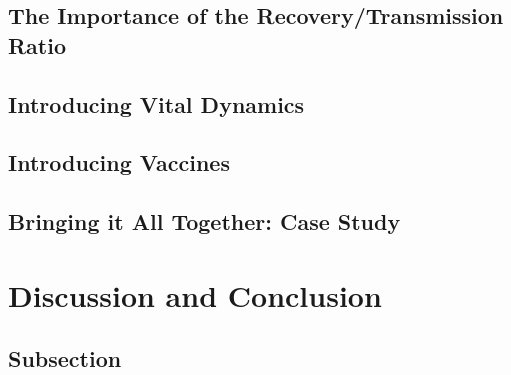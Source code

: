 \documentclass[]{article}
\begin{document}
\subsection{The Importance of the Recovery/Transmission Ratio} \label{sec:recovery-rates}


\subsection{Introducing Vital Dynamics} \label{sec:vital-dynamics}

\subsection{Introducing Vaccines} \label{sec:vaccines}

\subsection{Bringing it All Together: Case Study} \label{sec:case-study}


\section{Discussion and Conclusion} \label{sec:conclusion}



\subsection{Subsection} \label{sec:subsection}



\end{document}
